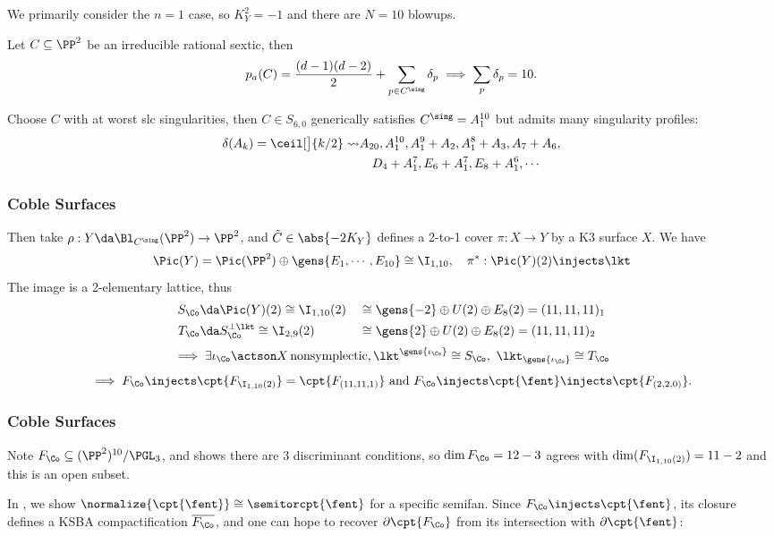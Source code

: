 \documentclass{beamer}
\begin{document}
{\begin{frame}
We primarily consider the $n=1$ case, so $K_Y^2 = -1$ and there are $N=10$ blowups.
\begin{construction}
Let $C \subseteq \PP^2$ be an irreducible rational sextic, then
\[
p_a(C) = { (d-1)(d-2)\over 2 } + \sum_{p\in C^\sing} \delta_p \implies \sum_p \delta_p = 10
.\]
\end{construction}
Choose $C$ with at worst slc singularities, then $C \in S_{6, 0}$ generically satisfies $C^\sing = A_1^{10}$ but admits many singularity profiles:
{\small
\begin{align*}
\delta(A_k) = \ceil[\big]{k/2} \leadsto & A_{20}, A_1^{10}, A_1^9 + A_2, A_1^8 + A_3, A_7 + A_6,  \\
&\quad  D_4 + A_1^7, E_6 + A_1^7, E_8 + A_1^6, \cdots
\end{align*}
}
\end{frame}
\begin{frame}\frametitle{Coble Surfaces}
Then take $\rho: Y \da \Bl_{C^\sing}(\PP^2) \to \PP^2$, and $\tilde C \in\abs{-2K_Y}$ defines a 2-to-1 cover $\pi: X\to Y$ by a K3 surface $X$. We have
\[
\Pic(Y) = \Pic(\PP^2) \oplus \gens{E_1, \cdots, E_{10}} \cong \I_{1, 10}, \quad 
\pi^*: \Pic(Y)(2) \injects \lkt
\]
The image is a 2-elementary \cite{Nik79a} lattice, thus
\begin{align*}
S_{\Co} &\da \Pic(Y)(2) \cong \I_{1, 10}(2) &&\cong \gens{-2} \oplus U(2) \oplus E_8(2) = (11,11,11)_1 \\
T_{\Co} &\da S_{\Co}^{\perp \lkt} \cong \I_{2, 9}(2) &&\cong \gens{2} \oplus U(2) \oplus E_8(2) = (11,11,11)_2
\end{align*}
\[
\implies \exists \iota_{\Co}\actson X \,\text{nonsymplectic,}\,
\lkt^{\gens{\iota_{\Co}}} \cong S_{\Co},\,\,  \lkt_{\gens{\iota_{\Co}}} \cong T_{\Co}
\]
\[
\implies F_{\Co} \injects \cpt{ F_{\I_{1, 10}(2)} } = \cpt{ F_{(11,11,1)} } \text{ and } F_{\Co} \injects \cpt{ \fent } \injects \cpt{F_{(2,2,0)}}
.\]
\end{frame}

\begin{frame}\frametitle{Coble Surfaces}
Note $F_{\Co} \subseteq (\PP^2)^{10}/\PGL_3$, and \cite{Cob19} shows there are 3 discriminant conditions, so $\dim{F_{\Co}} = 12-3$ agrees with $\dim( F_{\I_{1, 10}(2)} ) = 11-2$ and this is an open subset.

\begin{goal}
In \cite{AEGS23}, we show $\normalize{ \cpt{\fent} } \cong \semitorcpt{\fent}$ for a specific semifan.
Since $F_{\Co} \injects \cpt{\fent}$, its closure defines a KSBA compactification $\overline{F_{\Co}}$, and one can hope to recover $\partial \cpt{ F_{\Co}}$ from its intersection with $\partial \cpt{\fent}$:
\end{goal}


\end{frame}}
\end{document}
